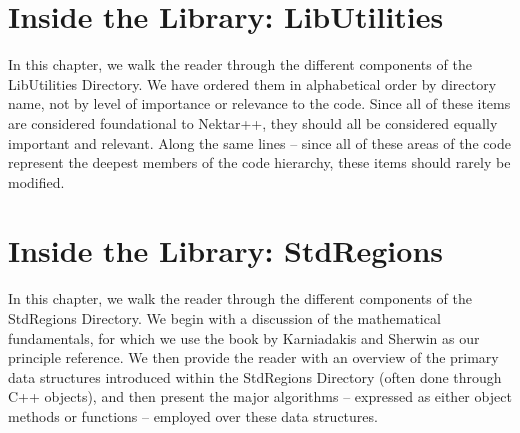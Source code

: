 
\chapter{Inside the Library: LibUtilities}

In this chapter, we walk the reader through the different components of the LibUtilities Directory.
We have ordered them in alphabetical order by directory name, not by level of importance or
relevance to the code.  Since all of these items are considered foundational to Nektar++, they
should all be considered equally important and relevant.   Along the same lines -- since all of
these areas of the code represent the deepest members of the code hierarchy, these
items should rarely be modified. 























\chapter{Inside the Library: StdRegions}
\label{chap:stdregions}

In this chapter, we walk the reader through the different components of the StdRegions Directory.
We begin with a discussion of the mathematical fundamentals, for which we use the book
by Karniadakis and Sherwin \cite{KaSh05} as our principle reference.  We then provide
the reader with an overview of the primary data structures introduced within the
StdRegions Directory (often done through C++ objects), and then present the major 
algorithms -- expressed as either object methods or functions -- employed over these data structures.  

